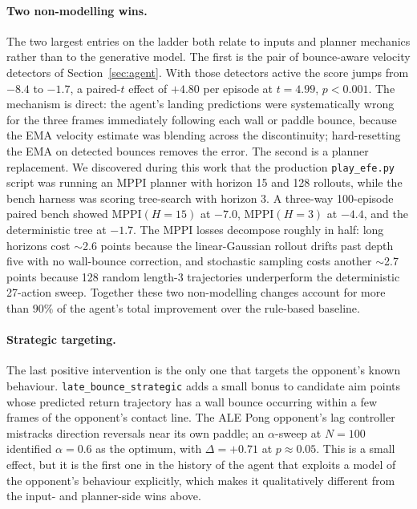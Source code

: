 \documentclass[runningheads]{llncs}
\begin{document}
\paragraph{Two non-modelling wins.}
The two largest entries on the ladder both relate to inputs and
planner mechanics rather than to the generative model. The first is
the pair of bounce-aware velocity detectors of
Section~\ref{sec:agent}. With those detectors active the score
jumps from $-8.4$ to $-1.7$, a paired-$t$ effect of $+4.80$ per
episode at $t = 4.99$, $p < 0.001$. The mechanism is direct: the
agent's landing predictions were systematically wrong for the three
frames immediately following each wall or paddle bounce, because
the EMA velocity estimate was blending across the discontinuity;
hard-resetting the EMA on detected bounces removes the error. The
second is a planner replacement. We discovered during this work
that the production \texttt{play\_efe.py} script was running an MPPI
planner with horizon 15 and 128 rollouts, while the bench harness
was scoring tree-search with horizon 3. A three-way 100-episode
paired bench showed MPPI$(H{=}15)$ at $-7.0$, MPPI$(H{=}3)$ at
$-4.4$, and the deterministic tree at $-1.7$. The MPPI losses
decompose roughly in half: long horizons cost $\sim$2.6 points
because the linear-Gaussian rollout drifts past depth five with no
wall-bounce correction, and stochastic sampling costs another
$\sim$2.7 points because 128 random length-3 trajectories
underperform the deterministic 27-action sweep. Together these two
non-modelling changes account for more than $90\%$ of the agent's
total improvement over the rule-based baseline.

\paragraph{Strategic targeting.}
The last positive intervention is the only one that targets the
opponent's known behaviour. \texttt{late\_bounce\_strategic} adds a
small bonus to candidate aim points whose predicted return
trajectory has a wall bounce occurring within a few frames of the
opponent's contact line. The ALE Pong opponent's lag controller
mistracks direction reversals near its own paddle; an
$\alpha$-sweep at $N=100$ identified $\alpha{=}0.6$ as the
optimum, with $\Delta = +0.71$ at $p \approx 0.05$. This is a
small effect, but it is the first one in the history of the agent
that exploits a model of the opponent's behaviour explicitly,
which makes it qualitatively different from the input- and
planner-side wins above.
\end{document}
